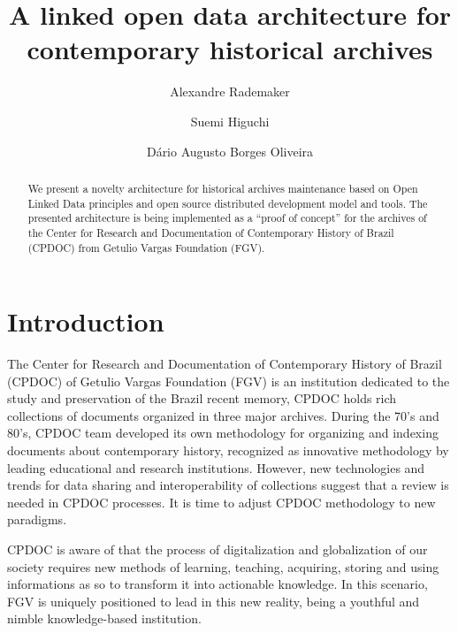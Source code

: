 \documentclass{llncs}
\begin{document}
\title{A linked open data architecture for contemporary historical archives}  
\author{Alexandre Rademaker 
  \and Suemi Higuchi
  \and D\'ario Augusto Borges Oliveira}
\maketitle

\begin{abstract}
  We present a novelty architecture for historical archives maintenance
  based on Open Linked Data principles and open source distributed
  development model and tools. The presented architecture is being
  implemented as a ``proof of concept'' for the archives of the Center
  for Research and Documentation of Contemporary History of Brazil
  (CPDOC) from Getulio Vargas Foundation (FGV).
\end{abstract}

\section{Introduction}


The Center for Research and Documentation of Contemporary History of
Brazil (CPDOC) of Getulio Vargas Foundation (FGV) is an institution
dedicated to the study and preservation of the Brazil recent memory,
CPDOC holds rich collections of documents organized in three major
archives. During the 70's and 80's, CPDOC team developed its own
methodology for organizing and indexing documents about contemporary
history, recognized as innovative methodology by leading educational
and research institutions. However, new technologies and trends for
data sharing and interoperability of collections suggest that a review
is needed in CPDOC processes. It is time to adjust CPDOC methodology 
to new paradigms.

CPDOC is aware of that the process of digitalization and globalization
of our society requires new methods of learning, teaching, acquiring,
storing and using informations as so to transform it into
actionable knowledge. In this scenario, FGV is uniquely positioned to
lead in this new reality, being a youthful and nimble knowledge-based
institution.

\end{document}
